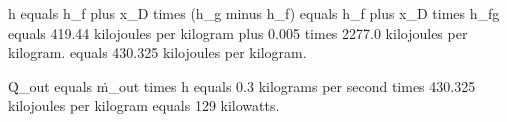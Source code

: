 h equals h_f plus x_D times (h_g minus h_f) equals h_f plus x_D times h_fg equals 419.44 kilojoules per kilogram plus 0.005 times 2277.0 kilojoules per kilogram.  
equals 430.325 kilojoules per kilogram.  

Q̇_out equals ṁ_out times h equals 0.3 kilograms per second times 430.325 kilojoules per kilogram equals 129 kilowatts.